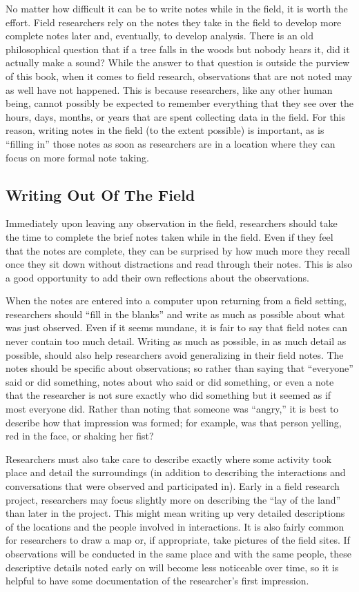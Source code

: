 No matter how difficult it can be to write notes while in the field, it is worth the effort. Field researchers rely on the notes they take in the field to develop more complete notes later and, eventually, to develop analysis. There is an old philosophical question that if a tree falls in the woods but nobody hears it, did it actually make a sound? While the answer to that question is outside the purview of this book, when it comes to field research, observations that are not noted may as well have not happened. This is because researchers, like any other human being, cannot possibly be expected to remember everything that they see over the hours, days, months, or years that are spent collecting data in the field. For this reason, writing notes in the field (to the extent possible) is important, as is ``filling in'' those notes as soon as researchers are in a location where they can focus on more formal note taking.

\subsection{Writing Out Of The Field}

Immediately upon leaving any observation in the field, researchers should take the time to complete the brief notes taken while in the field. Even if they feel that the notes are complete, they can be surprised by how much more they recall once they sit down without distractions and read through their notes. This is also a good opportunity to add their own reflections about the observations.

When the notes are entered into a computer upon returning from a field setting, researchers should ``fill in the blanks'' and write as much as possible about what was just observed. Even if it seems mundane, it is fair to say that field notes can never contain too much detail. Writing as much as possible, in as much detail as possible, should also help researchers avoid generalizing in their field notes. The notes should be specific about observations; so rather than saying that ``everyone'' said or did something, notes about who said or did something, or even a note that the researcher is not sure exactly who did something but it seemed as if most everyone did. Rather than noting that someone was ``angry,'' it is best to describe how that impression was formed; for example, was that person yelling, red in the face, or shaking her fist?

Researchers must also take care to describe exactly where some activity took place and detail the surroundings (in addition to describing the interactions and conversations that were observed and participated in). Early in a field research project, researchers may focus slightly more on describing the ``lay of the land'' than later in the project. This might mean writing up very detailed descriptions of the locations and the people involved in interactions. It is also fairly common for researchers to draw a map or, if appropriate, take pictures of the field sites. If observations will be conducted in the same place and with the same people, these descriptive details noted early on will become less noticeable over time, so it is helpful to have some documentation of the researcher's first impression. 

